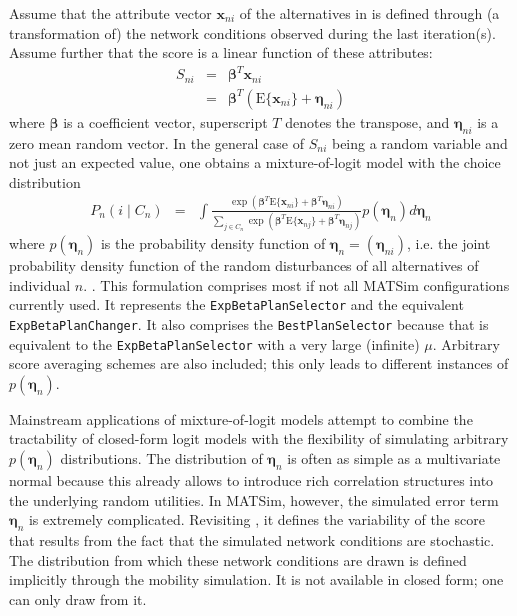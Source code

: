 Assume that the attribute vector $\mathbf{x}_{ni}$ of the alternatives in 
is defined through (a transformation of) the network conditions observed
during the last iteration(s). Assume further that the score is a linear
function of these attributes:
\begin{eqnarray}
S_{ni} & = & \boldsymbol{\beta}^{T}\mathbf{x}_{ni}\\
 & = & \boldsymbol{\beta}^{T}(\text{E}\{\mathbf{x}_{ni}\}+\boldsymbol{\eta}_{ni})\label{eq:score}
\end{eqnarray}
where $\boldsymbol{\beta}$ is a coefficient vector, superscript $T$ denotes the transpose,
and $\boldsymbol{\eta}_{ni}$ is a zero mean random vector. 
In the general case of $S_{ni}$ being a random
variable and not just an expected value, one obtains a mixture-of-logit
model with the choice distribution
\begin{eqnarray}
P_{n}(i\mid C_{n}) & = & 
\int\frac{\exp\left(\boldsymbol{\beta}^{T}\text{E}\{\mathbf{x}_{ni}\}+\boldsymbol{\beta}^{T}\boldsymbol{\eta}_{ni}\right)}
{\sum_{j\in C_{n}}\exp\left(\boldsymbol{\beta}^{T}\text{E}\{\mathbf{x}_{nj}\}+\boldsymbol{\beta}^{T}\boldsymbol{\eta}_{nj}\right)}
p(\boldsymbol{\eta}_{n})d\boldsymbol{\eta}_{n}\label{eq:mixture-of-logit}
\end{eqnarray}
where $p(\boldsymbol{\eta}_{n})$ is the probability density function of 
$\boldsymbol{\eta}_{n}=(\boldsymbol{\eta}_{ni})$, i.e. the joint probability
density function of the random disturbances of all alternatives of individual $n$.
\citep{train-2003}. This formulation comprises most if not all MATSim
configurations currently used. It represents the \lstinline{ExpBetaPlanSelector}
and the equivalent \lstinline{ExpBetaPlanChanger}. It also comprises
the \lstinline{BestPlanSelector} because that is equivalent to the \lstinline{ExpBetaPlanSelector}
with a very large (infinite) $\mu$. Arbitrary score averaging schemes
are also included; this only leads to different instances of $p(\boldsymbol{\eta}_{n})$.

Mainstream applications of mixture-of-logit models attempt to combine
the tractability of closed-form logit models with the flexibility of
simulating arbitrary $p(\boldsymbol{\eta}_n)$ distributions.
The distribution of $\boldsymbol{\eta}_n$ is often as simple as a multivariate normal
because this already allows to introduce rich correlation structures
into the underlying random utilities. In MATSim, however, the simulated
error term $\boldsymbol{\eta}_n$ is extremely complicated. Revisiting ,
it defines the variability of the score that results from the fact
that the simulated network conditions are stochastic. The distribution
from which these network conditions are drawn is defined implicitly
through the mobility simulation. It is not available in closed form;
one can only draw from it.

